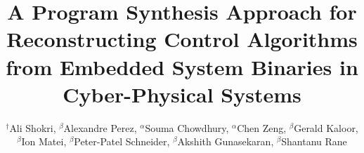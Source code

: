 \documentclass[sigconf,review]{acmart}
\begin{document}
\title[A Program Synthesis Approach for Reconstructing Control Algorithms from Embedded System Binaries.]{A Program Synthesis Approach for Reconstructing Control Algorithms from Embedded System Binaries in Cyber-Physical Systems}


\author{$^\dagger$Ali Shokri, $^\beta$Alexandre Perez, $^\alpha$Souma Chowdhury, $^\alpha$Chen Zeng, $^\beta$Gerald Kaloor, $^\beta$Ion Matei, $^\beta$Peter-Patel Schneider, $^\beta$Akshith Gunasekaran, $^\beta$Shantanu Rane}

\renewcommand{\shortauthors}{A. Shokri et al.}



\end{document}
